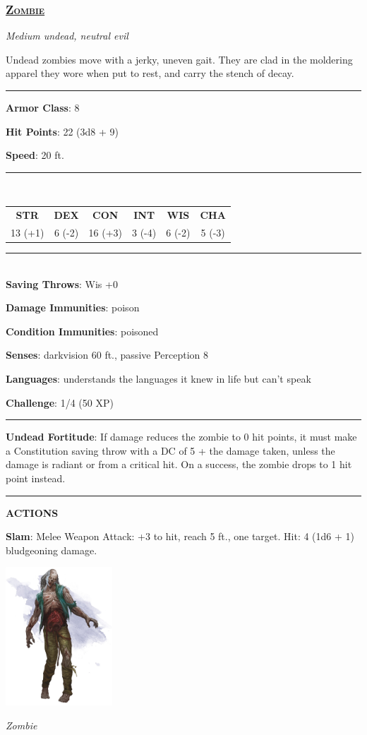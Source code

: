 \subsubsection*{\underline{\textsc{\Large Zombie}}}
\noindent\emph{Medium undead, neutral evil}

Undead zombies move with a jerky, uneven gait. They are clad in the moldering apparel they wore when put to rest, and carry the stench of decay.

\noindent\rule{0.5\textwidth}{0.5pt}

\noindent\textbf{Armor Class}: 8

\noindent\textbf{Hit Points}: 22 (3d8 + 9)

\noindent\textbf{Speed}: 20 ft.

\noindent\rule{0.5\textwidth}{0.5pt} \\
\begin{table}[H]
	\begin{tabular}{cccccc}
		\textbf{STR} & \textbf{DEX} & \textbf{CON} & \textbf{INT} & \textbf{WIS} & \textbf{CHA} \\
		13 (+1) & 6 (-2) & 16 (+3) & 3 (-4) & 6 (-2) & 5 (-3) \\
	\end{tabular}
\end{table}
\noindent\rule{0.5\textwidth}{0.5pt} \\

\noindent\textbf{Saving Throws}: Wis +0

\noindent\textbf{Damage Immunities}: poison

\noindent\textbf{Condition Immunities}: poisoned

\noindent\textbf{Senses}: darkvision 60 ft., passive Perception 8

\noindent\textbf{Languages}: understands the languages it knew in life but can't speak

\noindent\textbf{Challenge}: 1/4 (50 XP)

\noindent\rule{0.5\textwidth}{0.5pt}

\noindent\textbf{Undead Fortitude}: If damage reduces the zombie to 0 hit points, it must make a Constitution saving throw with a DC of 5 + the damage taken, unless the damage is radiant or from a critical hit. On a success, the zombie drops to 1 hit point instead.

\noindent\rule{0.5\textwidth}{0.5pt}

\noindent\textbf{ACTIONS}

\noindent\textbf{Slam}: Melee Weapon Attack: +3 to hit, reach 5 ft., one target. Hit: 4 (1d6 + 1) bludgeoning damage.

\begin{center}
	\includegraphics[width = 0.3\textwidth]{zombie}
	
	\emph{Zombie}
\end{center}